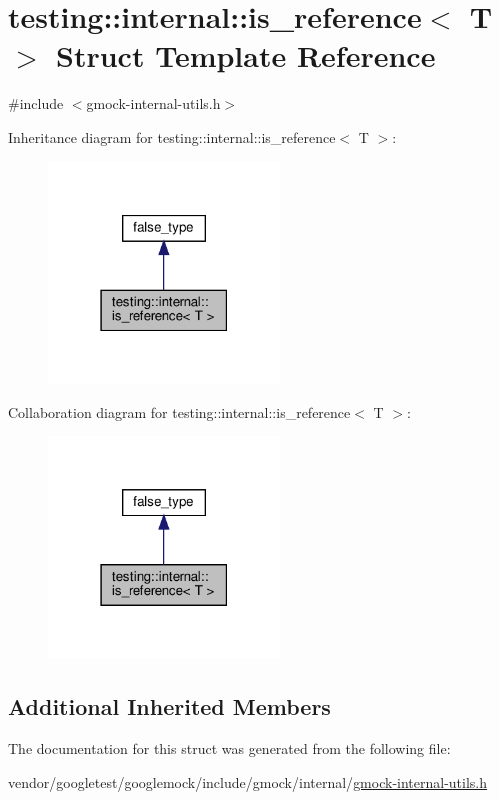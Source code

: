 \hypertarget{structtesting_1_1internal_1_1is__reference}{}\section{testing\+:\+:internal\+:\+:is\+\_\+reference$<$ T $>$ Struct Template Reference}
\label{structtesting_1_1internal_1_1is__reference}


{\ttfamily \#include $<$gmock-\/internal-\/utils.\+h$>$}



Inheritance diagram for testing\+:\+:internal\+:\+:is\+\_\+reference$<$ T $>$\+:
\nopagebreak
\begin{figure}[H]
\begin{center}
\leavevmode
\includegraphics[width=174pt]{structtesting_1_1internal_1_1is__reference__inherit__graph}
\end{center}
\end{figure}


Collaboration diagram for testing\+:\+:internal\+:\+:is\+\_\+reference$<$ T $>$\+:
\nopagebreak
\begin{figure}[H]
\begin{center}
\leavevmode
\includegraphics[width=174pt]{structtesting_1_1internal_1_1is__reference__coll__graph}
\end{center}
\end{figure}
\subsection*{Additional Inherited Members}


The documentation for this struct was generated from the following file\+:\begin{DoxyCompactItemize}
\item 
vendor/googletest/googlemock/include/gmock/internal/\hyperlink{gmock-internal-utils_8h}{gmock-\/internal-\/utils.\+h}\end{DoxyCompactItemize}
